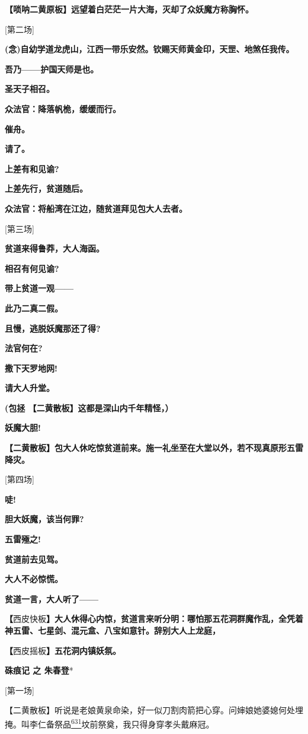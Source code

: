 \textbf{【唢呐二黄原板】远望着白茫茫一片大海，灭却了众妖魔方称胸怀。}

{[}第二场{]}

\textbf{(念)自幼学道龙虎山，江西一带乐安然。钦赐天师黄金印，天罡、地煞任我传。}

\textbf{吾乃------护国天师是也。}

\textbf{圣天子相召。}

\textbf{众法官：降落帆桅，缓缓而行。}

\textbf{催舟。}

\textbf{请了。}

\textbf{上差有和见谕?}

\textbf{上差先行，贫道随后。}

\textbf{众法官：将船湾在江边，随贫道拜见包大人去者。}

{[}第三场{]}

\textbf{贫道来得鲁莽，大人海函。}

\textbf{相召有何见谕?}

\textbf{带上贫道一观------}

\textbf{此乃二真二假。}

\textbf{且慢，逃脱妖魔那还了得?}

\textbf{法官何在?}

\textbf{撒下天罗地网!}

\textbf{请大人升堂。}

\textbf{(包拯 【二黄散板】这都是深山内千年精怪，）}

\textbf{妖魔大胆!}

\textbf{【二黄散板】包大人休吃惊贫道前来。施一礼坐至在大堂以外，若不现真原形五雷降灾。}

{[}第四场{]}

\textbf{唗!}

\textbf{胆大妖魔，该当何罪?}

\textbf{五雷殛之!}

\textbf{贫道前去见驾。}

\textbf{大人不必惊慌。}

\textbf{贫道一言，大人听了------}

\textbf{【}西皮快板\textbf{】大人休得心内惊，贫道言来听分明：哪怕那五花洞群魔作乱，全凭着神五雷、七星剑、混元盒、八宝如意针。辞别大人上龙庭，}

\textbf{【}西皮摇板\textbf{】五花洞内镇妖氛。}

\textbf{硃痕记 之 朱春登}*

{[}第一场{]}

【二黄散板】听说是老娘黄泉命染，好一似刀割肉箭把心穿。问婶娘她婆媳何处埋掩。叫李仁备祭品\protect\hyperlink{fn631}{\textsuperscript{631}}坟前祭奠，我只得身穿孝头戴麻冠。

